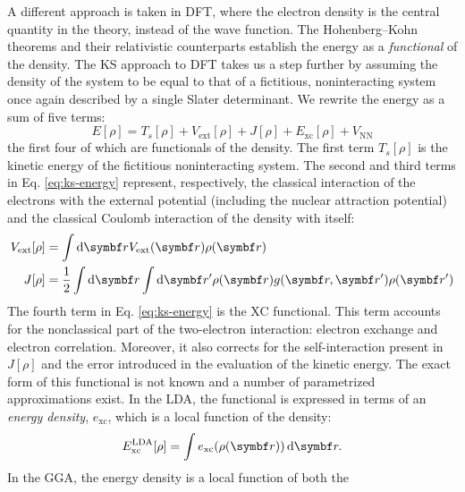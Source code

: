 A different approach is taken in \gls{DFT}, where the electron density
is the central quantity in the theory, instead of the wave function.
The Hohenberg--Kohn theorems\autocite{Hohenberg1964-wo, Eschrig2012-as}
and their relativistic counterparts\autocite{Rajagopal1973-ns,
Dreizler2012-ay} establish the energy as a \emph{functional} of the
density.
The \gls{KS} approach to \acrshort{DFT} takes us a step further by
assuming the density of the system to be equal to that of a fictitious,
noninteracting system once again described by a single Slater
determinant.\autocite{Kohn1965-hg}
We rewrite the energy as a sum of five terms:
\begin{equation}\label{eq:ks-energy}
 E[\rho] = T_s[\rho] + V_\mathrm{ext}[\rho] + J[\rho] + E_\mathrm{xc}[\rho] + V_\mathrm{NN}
\end{equation}
the first four of which are functionals of the density. The first term
$T_s[\rho]$ is the kinetic energy of the fictitious noninteracting
system.
The second and third terms in Eq. \eqref{eq:ks-energy} represent,
respectively, the classical interaction of the electrons with the
external potential (including the nuclear attraction potential) and the
classical Coulomb interaction of the density with itself:
\begin{subequations}
 \begin{align}
   V_\mathrm{ext}[\rho] &= \int\diff\vect{r} V_\mathrm{ext}(\vect{r})\rho(\vect{r}) \\
   J[\rho] &=
   \frac{1}{2}\int\diff\vect{r}\int\diff\vect{r}^\prime
   \rho(\vect{r})g(\vect{r}, \vect{r}^\prime)\rho(\vect{r}^\prime)
 \end{align}
\end{subequations}
The fourth term in Eq. \eqref{eq:ks-energy} is the \gls{XC} functional.
This term accounts for the nonclassical part of the two-electron
interaction: electron exchange and electron correlation.
Moreover, it also corrects for the self-interaction present in $J[\rho]$
and the error introduced in the evaluation of the kinetic energy.
The exact form of this functional is not known and a number of
parametrized approximations exist.\autocite{Koch2015-wq}
In the \gls{LDA}, the functional is expressed in terms of an
\emph{energy density}, $e_\mathrm{xc}$, which is a local function of the
density:
\begin{equation}
 E^\mathrm{LDA}_\mathrm{xc}[\rho] = \int e_\mathrm{xc}(\rho(\vect{r}))\diff\vect{r}.
\end{equation}
In the \gls{GGA}, the energy density is a local function of both the

